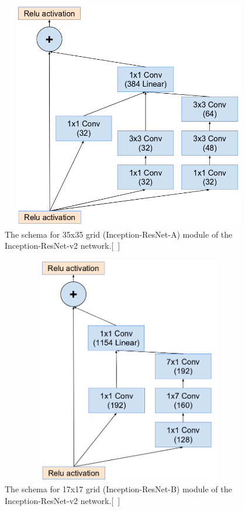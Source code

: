 \documentclass[a4paper,12pt, twoside]{NITKReport}
\begin{document}
\begin{figure}[h]
  \centering
    \includegraphics[height=10cm,width=13cm]{figure16.png}
    \caption{The  schema  for 35x35 grid  (Inception-ResNet-A) module of the Inception-ResNet-v2 network.[~\cite{szegedy2017inception}]}
    \label{16}

\end{figure}

\begin{figure}[h]
  \centering
   
    \includegraphics[height=10cm,width=13cm]{figure17.png}
    \caption{ The  schema  for 17x17 grid  (Inception-ResNet-B) module of the Inception-ResNet-v2 network.[~\cite{szegedy2017inception}]}
    \label{17}
 
 \end{figure}
 
\end{document}
